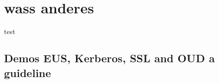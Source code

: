 \documentclass[a4paper,,tablecaptionabove]{scrartcl}
\begin{document}
\hypertarget{wass-anderes}{%
\section{wass anderes}\label{wass-anderes}}

test

\hypertarget{demos-eus-kerberos-ssl-and-oud-a-guideline-1}{%
\subsection{Demos EUS, Kerberos, SSL and OUD a
guideline}\label{demos-eus-kerberos-ssl-and-oud-a-guideline-1}}
\end{document}
